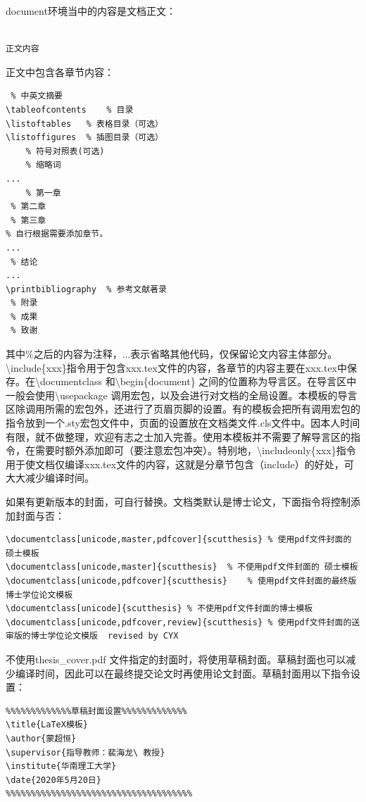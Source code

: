 document环境当中的内容是文档正文：
\begin{lstlisting}

正文内容

\end{lstlisting}
正文中包含各章节内容：
\begin{lstlisting}
 % 中英文摘要
\tableofcontents	% 目录
\listoftables	% 表格目录（可选）
\listoffigures	% 插图目录（可选）
	% 符号对照表(可选)
 	% 缩略词	
...
	% 第一章
 % 第二章
 % 第三章
% 自行根据需要添加章节。
...
 % 结论
...
\printbibliography	% 参考文献著录
 % 附录
 % 成果
 % 致谢
\end{lstlisting}
其中$\%$之后的内容为注释，...表示省略其他代码，仅保留论文内容主体部分。\textbackslash{}include\{xxx\}指令用于包含xxx.tex文件的内容，各章节的内容主要在xxx.tex中保存。在\textbackslash{}documentclass 和\textbackslash{}begin\{document\} 之间的位置称为导言区。在导言区中一般会使用\textbackslash{}usepackage 调用宏包，以及会进行对文档的全局设置。本模板的导言区除调用所需的宏包外，还进行了页眉页脚的设置。有的模板会把所有调用宏包的指令放到一个.sty宏包文件中，页面的设置放在文档类文件.cls文件中。因本人时间有限，就不做整理，欢迎有志之士加入完善。使用本模板并不需要了解导言区的指令，在需要时额外添加即可（要注意宏包冲突）。特别地，\textbackslash{}includeonly\{xxx\}指令用于使文档仅编译xxx.tex文件的内容，这就是分章节包含（include）的好处，可大大减少编译时间。

如果有更新版本的封面，可自行替换。文档类默认是博士论文，下面指令将控制添加封面与否：
\begin{lstlisting}
\documentclass[unicode,master,pdfcover]{scutthesis}	% 使用pdf文件封面的 硕士模板
\documentclass[unicode,master]{scutthesis}	% 不使用pdf文件封面的 硕士模板
\documentclass[unicode,pdfcover]{scutthesis}	% 使用pdf文件封面的最终版博士学位论文模板
\documentclass[unicode]{scutthesis}	% 不使用pdf文件封面的博士模板
\documentclass[unicode,pdfcover,review]{scutthesis}	% 使用pdf文件封面的送审版的博士学位论文模版  revised by CYX
\end{lstlisting}
不使用thesis\_cover.pdf 文件指定的封面时，将使用草稿封面。草稿封面也可以减少编译时间，因此可以在最终提交论文时再使用论文封面。草稿封面用以下指令设置：
\begin{lstlisting}
%%%%%%%%%%%%%草稿封面设置%%%%%%%%%%%%%	
\title{LaTeX模板}	
\author{蒙超恒}	
\supervisor{指导教师：裴海龙\ 教授}	
\institute{华南理工大学}	
\date{2020年5月20日}
%%%%%%%%%%%%%%%%%%%%%%%%%%%%%%%%%%%%%
\end{lstlisting}
